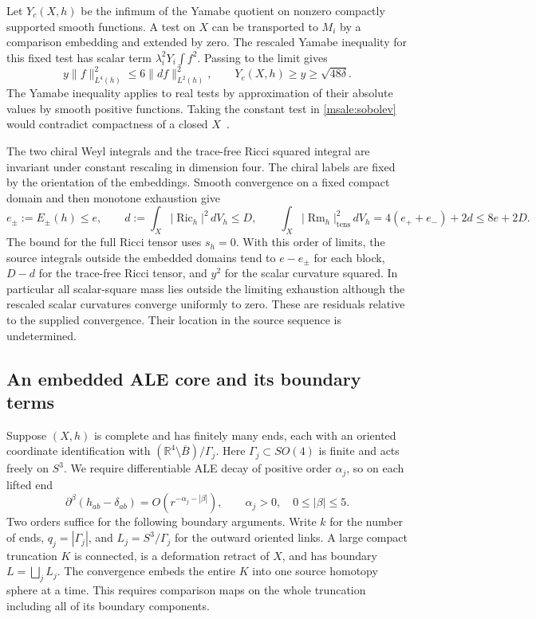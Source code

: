 \documentclass[11pt]{article}
\numberwithin{equation}{section}
\theoremstyle{definition}
\theoremstyle{remark}
\DeclareMathOperator{\Ric}{Ric}
\DeclareMathOperator{\Rm}{Rm}
\begin{document}
Let \(Y_c(X,h)\) be the infimum of the Yamabe quotient on nonzero
compactly supported smooth functions. A test on \(X\) can be
transported to \(M_i\) by a comparison embedding and extended by
zero. The rescaled Yamabe inequality for this fixed test has
scalar term \(\lambda_i^2Y_i\int f^2\). Passing to the limit gives
\begin{equation}\label{msale:sobolev}
 y\|f\|_{L^4(h)}^2\le 6\|df\|_{L^2(h)}^2,\qquad
 Y_c(X,h)\ge y\ge\sqrt{48\delta}.
\end{equation}
The Yamabe inequality applies to real tests by approximation of
their absolute values by smooth positive functions. Taking the
constant test in \eqref{msale:sobolev} would contradict compactness
of a closed \(X\)~\cite[\S\S1--3]{LeeParker1987Yamabe}.

The two chiral Weyl integrals and the trace-free Ricci squared
integral are invariant under constant rescaling in dimension
four. The chiral labels are fixed by the orientation of the
embeddings. Smooth convergence on a fixed compact domain and
then monotone exhaustion give
\begin{equation}\label{msale:budgets}
 e_\pm:=E_\pm(h)\le e,\qquad
 d:=\int_X|\Ric_h|^2\,dV_h\le D,\qquad
 \int_X|\Rm_h|_{\mathrm{tens}}^2\,dV_h
       =4(e_++e_-)+2d\le8e+2D .
\end{equation}
The bound for the full Ricci tensor uses \(s_h=0\).
With this order of limits, the source integrals outside the
embedded domains tend to \(e-e_\pm\) for each block, \(D-d\)
for the trace-free Ricci tensor, and \(y^2\) for the scalar
curvature squared. In particular all scalar-square mass lies
outside the limiting exhaustion although the rescaled scalar
curvatures converge uniformly to zero. These are residuals
relative to the supplied convergence. Their location in the
source sequence is undetermined.

\subsection{An embedded ALE core and its boundary terms}

Suppose \((X,h)\) is complete and has finitely many ends, each
with an oriented coordinate identification with
\((\mathbb R^4\setminus\overline{B})/\Gamma_j\).
Here \(\Gamma_j\subset SO(4)\) is finite and acts freely on
\(S^3\). We require differentiable ALE decay of positive order
\(\alpha_j\), so on each lifted end
\begin{equation}\label{msale:end-decay}
 \partial^\beta(h_{ab}-\delta_{ab})
   =O(r^{-\alpha_j-|\beta|}),\qquad
 \alpha_j>0,\quad 0\le|\beta|\le5.
\end{equation}
Two orders suffice for the following boundary arguments. Write
\(k\) for the number of ends, \(q_j=|\Gamma_j|\), and
\(L_j=S^3/\Gamma_j\) for the outward oriented links. A large
compact truncation \(K\) is connected, is a deformation retract
of \(X\), and has boundary \(L=\bigsqcup_j L_j\). The convergence
embeds the entire \(K\) into one source homotopy sphere at a
time. This requires comparison maps on the whole truncation
including all of its boundary components.
\end{document}
